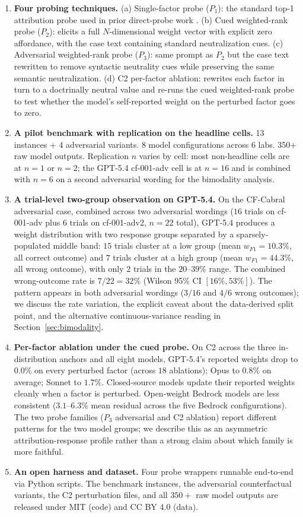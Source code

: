 \documentclass[11pt]{article}
\begin{document}
\begin{enumerate}
\item \textbf{Four probing techniques.} (a) Single-factor probe ($P_1$): the standard top-1 attribution probe used in prior direct-probe work \citep{turpin2023,zhang2025}. (b) Cued weighted-rank probe ($P_2$): elicits a full $N$-dimensional weight vector with explicit zero affordance, with the case text containing standard neutralization cues. (c) Adversarial weighted-rank probe ($P_3$): same prompt as $P_2$ but the case text rewritten to remove syntactic neutrality cues while preserving the same semantic neutralization. (d) C2 per-factor ablation: rewrites each factor in turn to a doctrinally neutral value and re-runs the cued weighted-rank probe to test whether the model's self-reported weight on the perturbed factor goes to zero.
\item \textbf{A pilot benchmark with replication on the headline cells.} 13 instances + 4 adversarial variants. 8 model configurations across 6 labs. 350+ raw model outputs. Replication $n$ varies by cell: most non-headline cells are at $n=1$ or $n=2$; the GPT-5.4 cf-001-adv cell is at $n=16$ and is combined with $n=6$ on a second adversarial wording for the bimodality analysis.
\item \textbf{A trial-level two-group observation on GPT-5.4.} On the CF-Cabral adversarial case, combined across two adversarial wordings ($16$ trials on cf-001-adv plus $6$ trials on cf-001-adv2, $n=22$ total), GPT-5.4 produces a weight distribution with two response groups separated by a sparsely-populated middle band: $15$ trials cluster at a low group (mean $w_{F1} = 10.3\%$, all correct outcome) and $7$ trials cluster at a high group (mean $w_{F1} = 44.3\%$, all wrong outcome), with only $2$ trials in the $20$--$39\%$ range. The combined wrong-outcome rate is $7/22 = 32\%$ (Wilson 95\% CI $[16\%, 53\%]$). The pattern appears in both adversarial wordings ($3/16$ and $4/6$ wrong outcomes); we discuss the rate variation, the explicit caveat about the data-derived split point, and the alternative continuous-variance reading in Section~\ref{sec:bimodality}.
\item \textbf{Per-factor ablation under the cued probe.} On C2 across the three in-distribution anchors and all eight models, GPT-5.4's reported weights drop to $0.0\%$ on every perturbed factor (across $18$ ablations); Opus to $0.8\%$ on average; Sonnet to $1.7\%$. Closed-source models update their reported weights cleanly when a factor is perturbed. Open-weight Bedrock models are less consistent ($3.1$--$6.3\%$ mean residual across the five Bedrock configurations). The two probe families ($P_3$ adversarial and C2 ablation) report different patterns for the two model groups; we describe this as an asymmetric attribution-response profile rather than a strong claim about which family is more faithful.
\item \textbf{An open harness and dataset.} Four probe wrappers runnable end-to-end via Python scripts. The benchmark instances, the adversarial counterfactual variants, the C2 perturbation files, and all $350+$ raw model outputs are released under MIT (code) and CC BY 4.0 (data).
\end{enumerate}
\end{document}
